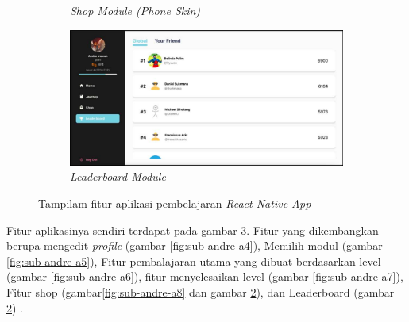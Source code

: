 \begin{figure}[H]
\begin{subfigure}[b]{0.4\textwidth}
		\caption{\textit{Shop Module (Phone Skin)}}
		\label{fig:sub-andre-a9}
	\end{subfigure}
	\hfill
	\begin{subfigure}[b]{0.4\textwidth}
		\centering
		\includegraphics[width=\linewidth]{contents/chapter-2/images/Andre-a10.png}
		\caption{\textit{Leaderboard Module}}
		\label{fig:sub-andre-a10}
	\end{subfigure}
	\caption{Tampilam fitur aplikasi pembelajaran \textit{React Native App}\cite{OctalysisFrameworkAndre}}
	\label{fig:interface fitur pembelajaran React Native}
\end{figure}
Fitur aplikasinya sendiri terdapat pada gambar \ref*{fig:interface fitur pembelajaran React Native}. Fitur yang dikembangkan berupa mengedit \textit{profile} (gambar \ref*{fig:sub-andre-a4}), Memilih modul (gambar \ref*{fig:sub-andre-a5}), Fitur pembalajaran utama yang dibuat berdasarkan level (gambar \ref*{fig:sub-andre-a6}),
fitur menyelesaikan level (gambar \ref*{fig:sub-andre-a7}), Fitur shop (gambar\ref*{fig:sub-andre-a8} dan gambar \ref*{fig:sub-andre-a10}), dan Leaderboard (gambar \ref*{fig:sub-andre-a10}) \cite{OctalysisFrameworkAndre}.
